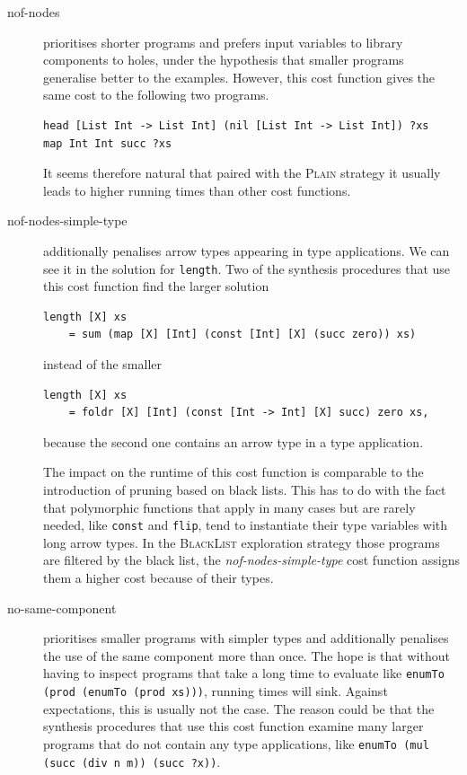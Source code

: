\begin{description}
\item[nof-nodes] prioritises shorter programs and prefers input variables to library components to holes, under the hypothesis that smaller programs generalise better to the examples. However, this cost function gives the same cost to the following two programs.
\begin{lstlisting}[style=plain]
head [List Int -> List Int] (nil [List Int -> List Int]) ?xs
map Int Int succ ?xs
\end{lstlisting}
It seems therefore natural that paired with the \textsc{Plain} strategy it usually leads to higher running times than other cost functions.

\item[nof-nodes-simple-type] additionally penalises arrow types appearing in type applications. We can see it in the solution for \lstinline?length?. Two of the synthesis procedures that use this cost function find the larger solution
\begin{lstlisting}
length [X] xs
    = sum (map [X] [Int] (const [Int] [X] (succ zero)) xs)
\end{lstlisting}
instead of the smaller
\begin{lstlisting}
length [X] xs
    = foldr [X] [Int] (const [Int -> Int] [X] succ) zero xs,
\end{lstlisting}
because the second one contains an arrow type in a type application.

The impact on the runtime of this cost function is comparable to the introduction of pruning based on black lists. This has to do with the fact that polymorphic functions that apply in many cases but are rarely needed, like \lstinline?const? and \lstinline?flip?, tend to instantiate their type variables with long arrow types. In the \textsc{BlackList} exploration strategy those programs are filtered by the black list, the \textit{nof-nodes-simple-type} cost function assigns them a higher cost because of their types.

\item[no-same-component] prioritises smaller programs with simpler types and additionally penalises the use of the same component more than once. The hope is that without having to inspect programs that take a long time to evaluate like \lstinline?enumTo (prod (enumTo (prod xs)))?, running times will sink. Against expectations, this is usually not the case. The reason could be that the synthesis procedures that use this cost function examine many larger programs that do not contain any type applications, like \lstinline!enumTo (mul (succ (div n m)) (succ ?x))!.
\end{description}


